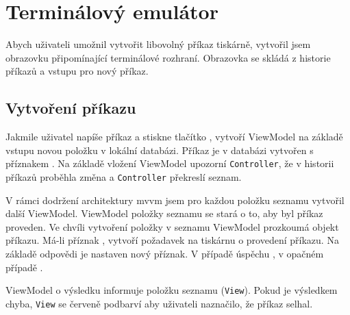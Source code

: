 \section{Terminálový emulátor}

Abych uživateli umožnil vytvořit libovolný příkaz tiskárně, vytvořil jsem obrazovku připomínající terminálové rozhraní.
Obrazovka se skládá z historie příkazů a vstupu pro nový příkaz.

\subsection{Vytvoření příkazu}

Jakmile uživatel napíše příkaz a stiskne tlačítko , vytvoří ViewModel na základě vstupu novou položku v lokální databázi.
Příkaz je v databázi vytvořen s příznakem .
Na základě vložení ViewModel upozorní \texttt{Controller}, že v historii příkazů proběhla změna a \texttt{Controller} překreslí seznam.

V rámci dodržení architektury \acrshort{mvvm} jsem pro každou položku seznamu vytvořil další ViewModel.
ViewModel položky seznamu se stará o to, aby byl příkaz proveden.
Ve chvíli vytvoření položky v seznamu ViewModel prozkoumá objekt příkazu.
Má-li příznak , vytvoří požadavek na tiskárnu o provedení příkazu.
Na základě odpovědi je nastaven nový příznak.
V případě úspěchu , v opačném případě .

ViewModel o výsledku informuje položku seznamu (\texttt{View}).
Pokud je výsledkem chyba, \texttt{View} se červeně podbarví aby uživateli naznačilo, že příkaz selhal.
